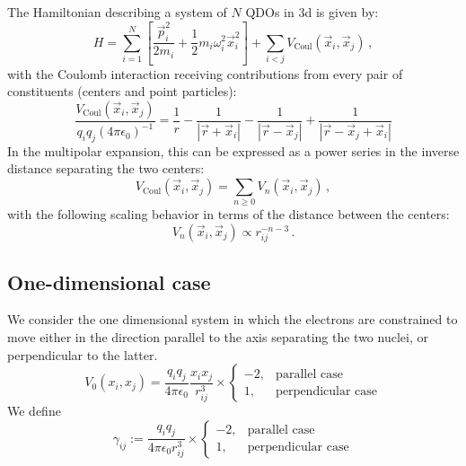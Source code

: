 \documentclass[reprint, amsmath, amssymb, aps]{revtex4-2}
\begin{document}
    The Hamiltonian describing a system of $N$ QDOs in 3d is given by:
    \begin{equation}
    \label{eq:full_QDO_Hamiltonian}
        H=\sum_{i=1}^N\left[\frac{\vec p_i^2}{2m_i} + \frac{1}{2}m_i\omega_i^2\vec x_i^2\right] +\sum_{i<j}V_\text{Coul}\left(\vec x_i, \vec x_j\right)\,,
    \end{equation}
    with the Coulomb interaction receiving contributions from every pair of constituents (centers and point particles):
    \begin{equation*}
        \frac{V_\text{Coul}\left(\vec x_i, \vec x_j\right)}{q_iq_j(4\pi\epsilon_0)^{-1}}=\frac{1}{r} - \frac{1}{|\vec r + \vec x_i|} - \frac{1}{|\vec r - \vec x_j|} + \frac{1}{|\vec r - \vec x_j + \vec x_i|}
    \end{equation*}
    In the multipolar expansion, this can be expressed as a power series in the inverse distance separating the two centers:
    \begin{equation*}
        V_\text{Coul}\left(\vec x_i, \vec x_j\right)= \sum_{n\geq 0} V_n\left(\vec x_i, \vec x_j\right)\,,
    \end{equation*}
    with the following scaling behavior in terms of the distance between the centers:
    \begin{equation*}
        V_n\left(\vec x_i, \vec x_j\right)\propto r_{ij}^{-n-3}\,.
    \end{equation*}

        \subsection{One-dimensional case}

        We consider the one dimensional system in which the electrons are constrained to move either in the direction parallel to the axis separating the two nuclei, or perpendicular to the latter.
        \begin{equation}
            V_0(x_i, x_j) = \frac{q_iq_j}{4\pi\epsilon_0}\frac{x_ix_j}{r_{ij}^3}\times
            \begin{cases}
                -2, & \text{parallel case} \\
                1, & \text{perpendicular case}
            \end{cases}
        \end{equation}
        We define
        \begin{equation}
            \gamma_{ij} := \frac{q_iq_j}{4\pi\epsilon_0r_{ij}^3}\times
            \begin{cases}
                -2, & \text{parallel case} \\
                1, & \text{perpendicular case}
            \end{cases}
        \end{equation}
\end{document}
